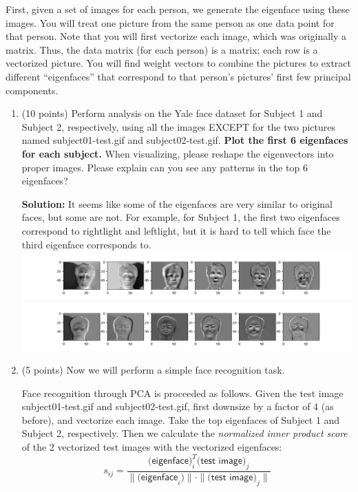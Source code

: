 \documentclass[twoside,12pt]{article}
\begin{document}
First, given a set of images for each person, we generate the eigenface using these images. You will treat one picture from the same person as one data point for that person. Note that you will first vectorize each image, which was originally a matrix. Thus, the data matrix (for each person) is a matrix; each row is a vectorized picture. You will find weight vectors to combine the pictures to extract different ``eigenfaces'' that correspond to that person's pictures' first few principal components. 


\begin{enumerate}

\item (10 points) Perform analysis on the Yale face dataset for Subject 1 and Subject 2, respectively, using all the images EXCEPT for the two pictures named \textsf{subject01-test.gif} and \textsf{subject02-test.gif}. {\bf Plot the first 6 eigenfaces for each subject.} When visualizing, please reshape the eigenvectors into proper images. Please explain can you see any patterns in the top 6 eigenfaces?
\begin{tcolorbox}
\textbf{Solution:} It seems like some of the eigenfaces are very similar to original faces, but some are not. For example, for Subject 1, the first two eigenfaces correspond to rightlight and leftlight, but it is hard to tell which face the third eigenface corresponds to.\\
\includegraphics[width=1.0\textwidth]{eigenface1.png}
\includegraphics[width=1.0\textwidth]{eigenface2.png}
\end{tcolorbox}

\item (5 points) Now we will perform a simple face recognition task. 

Face recognition through PCA is proceeded as follows. Given the test image \textsf{subject01-test.gif} and \textsf{subject02-test.gif}, first downsize by a factor of 4 (as before), and vectorize each image. Take the top eigenfaces of Subject 1 and Subject 2, respectively. Then we calculate the {\it normalized inner product score} of the 2 vectorized test images with the vectorized eigenfaces:
\[s_{ij} =\frac{\textsf{(eigenface})_i^T \textsf{(test image)}_j}{\|\textsf{(eigenface}_i)\| \cdot\|\textsf{(test image)}_j\|}\]


\end{enumerate}
\end{document}
